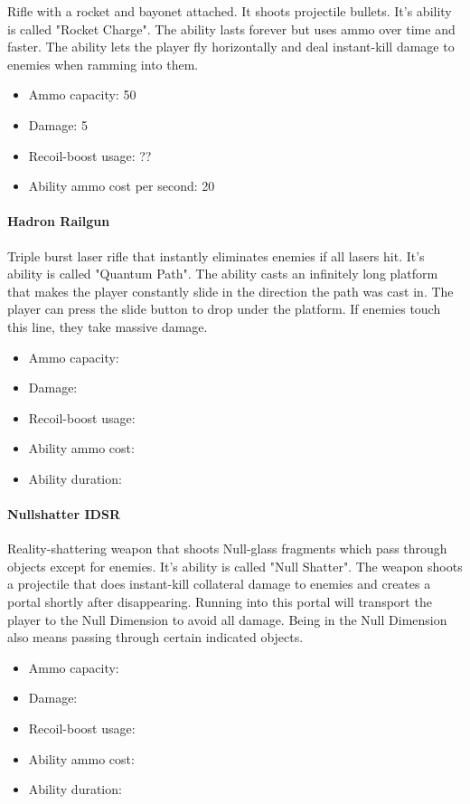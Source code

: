 \documentclass[12pt]{article}
\begin{document}
Rifle with a rocket and bayonet attached. It shoots projectile bullets. It's ability is called "Rocket Charge". The ability lasts forever but uses ammo over time and faster. The ability lets the player fly horizontally and deal instant-kill damage to enemies when ramming into them.

\begin{itemize}
	\item Ammo capacity: 50
	\item Damage: 5
	\item Recoil-boost usage: ??
	\item Ability ammo cost per second: 20
\end{itemize} 


\paragraph{Hadron Railgun}

Triple burst laser rifle that instantly eliminates enemies if all lasers hit. It's ability is called "Quantum Path". The ability casts an infinitely long platform that makes the player constantly slide in the direction the path was cast in. The player can press the slide button to drop under the platform. If enemies touch this line, they take massive damage. 


\begin{itemize}
	\item Ammo capacity: 
	\item Damage: 
	\item Recoil-boost usage: 
	\item Ability ammo cost: 
	\item Ability duration: 
\end{itemize}


\paragraph{Nullshatter IDSR}

Reality-shattering weapon that shoots Null-glass fragments which pass through objects except for enemies. It's ability is called "Null Shatter". The weapon shoots a projectile that does instant-kill collateral damage to enemies and creates a portal shortly after disappearing. Running into this portal will transport the player to the Null Dimension to avoid all damage. Being in the Null Dimension also means passing through certain indicated objects. 

\begin{itemize}
	\item Ammo capacity: 
	\item Damage: 
	\item Recoil-boost usage: 
	\item Ability ammo cost: 
	\item Ability duration: 
\end{itemize}
\end{document}
